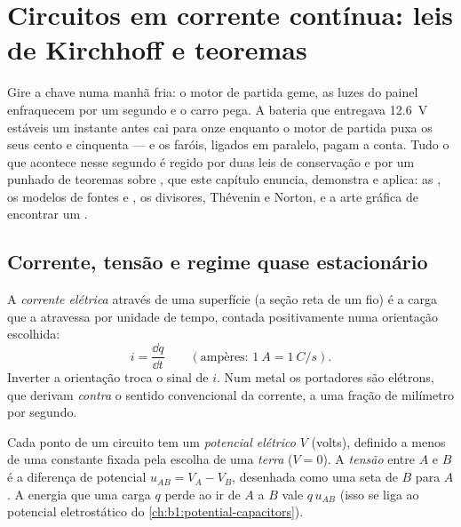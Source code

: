 \chapter{Circuitos em corrente contínua: leis de Kirchhoff e teoremas}\label{ch:b1:dc-circuits}

Gire a chave numa manhã fria: o motor de partida geme, as luzes do painel
enfraquecem por um segundo e o carro pega. A bateria que
entregava \qty{12.6}{V} estáveis um instante antes cai para onze enquanto
o motor de partida puxa os seus cento e cinquenta  --- e os faróis,
ligados em paralelo, pagam a conta. Tudo o que acontece nesse segundo é regido por
duas leis de conservação e por um punhado de teoremas sobre ,
que este capítulo enuncia, demonstra e aplica: as , os
modelos de fontes e , os divisores, Thévenin e Norton, e
a arte gráfica de encontrar um .

\section{Corrente, tensão e regime quase estacionário}

\begin{definition}\label{def:b1:dc-circuits:current}
A \emph{corrente elétrica} através de uma superfície (a seção reta de um fio)
é a carga que a atravessa por unidade de tempo, contada positivamente numa
orientação escolhida:
\[
i = \frac{\dd q}{\dd t} \qquad (\text{ampères: } \qty{1}{A} = \qty{1}{C/s}).
\]
Inverter a orientação troca o sinal de $i$. Num metal os
portadores são elétrons, que derivam \emph{contra} o sentido convencional
da corrente, a uma fração de milímetro por segundo.
\end{definition}

\begin{definition}\label{def:b1:dc-circuits:voltage}
Cada ponto de um circuito tem um \emph{potencial elétrico} $V$ (volts),
definido a menos de uma constante fixada pela escolha de uma \emph{terra} ($V = 0$).
A \emph{tensão} entre $A$ e $B$ é a diferença de potencial
$u_{AB} = V_A - V_B$, desenhada como uma seta de $B$ para $A$. A energia que uma
carga $q$ perde ao ir de $A$ a $B$ vale $q\,u_{AB}$ (isso se liga
ao potencial eletrostático do \cref{ch:b1:potential-capacitors}).
\end{definition}

